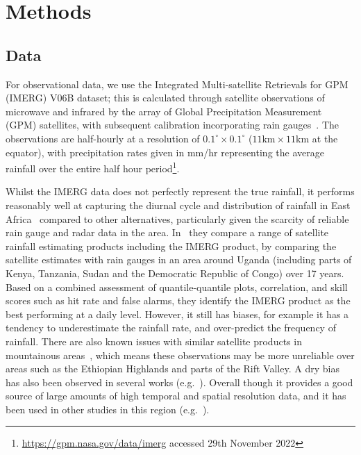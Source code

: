 \documentclass{article}
\begin{document}
\section{Methods}
\subsection{Data}

\label{sec:data}


For observational data, we use the Integrated Multi-satellite Retrievals for GPM (IMERG) V06B dataset; this is calculated through satellite observations of microwave and infrared by the array of Global Precipitation Measurement (GPM) satellites, with subsequent calibration incorporating rain gauges~\citep{huffman_nasa_2018}. The observations are half-hourly at a resolution of $0.1^{\circ} \times 0.1^{\circ}$ ($11\text{km} \times 11\text{km}$ at the equator), with precipitation rates given in mm/hr representing the average rainfall over the entire half hour period\footnote{\href{https://gpm.nasa.gov/data/imerg}{https://gpm.nasa.gov/data/imerg} accessed 29th November 2022}.


Whilst the IMERG data does not perfectly represent the true rainfall, it performs reasonably well at capturing the diurnal cycle and distribution of rainfall in East Africa~\citep{dezfuli_validation_2017, roca_comparing_2010, camberlin_major_2018} compared to other alternatives, particularly given the scarcity of reliable rain gauge and radar data in the area.  In~\cite{ageet_validation_2022} they compare a range of satellite rainfall estimating products including the IMERG product, by comparing the satellite estimates with rain gauges in an area around Uganda (including parts of Kenya, Tanzania, Sudan and the Democratic Republic of Congo) over 17 years. Based on a combined assessment of quantile-quantile plots, correlation, and skill scores such as hit rate and false alarms, they identify the IMERG product as the best performing at a daily level. However, it still has biases, for example it has a tendency to underestimate the rainfall rate, and over-predict the frequency of rainfall. There are also known issues with similar satellite products in mountainous areas~\citep{dinku_comparison_2010}, which means these observations may be more unreliable over areas such as the Ethiopian Highlands and parts of the Rift Valley. A dry bias has also been observed in several works (e.g.~\cite{vogel_skill_2018}). Overall though it provides a good source of large amounts of high temporal and spatial resolution data, and it has been used in other studies in this region (e.g.~\cite{woodhams_what_2018, finney_implications_2019, cafaro_convection-permitting_2021}).
\end{document}
